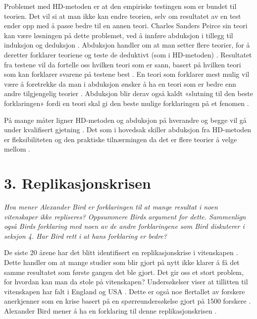 \documentclass[
]{book}
\begin{document}
Problemet med HD-metoden er at den empiriske testingen som er bundet til
teorien. Det vil si at man ikke kan endre teorien, selv om resultatet av
en test ender opp med å passe bedre til en annen teori. Charles Sanders
Peirce sin teori kan være løsningen på dette problemet, ved å innføre
abduksjon i tillegg til induksjon og deduksjon \citep{peirce1992}. Abduksjon
handler om at man setter flere teorier, for å deretter forklarer
teoriene og teste de deduktivt (som i HD-metoden) \citep{peirce1992}.
Resultatet fra testene vil da fortelle oss hvilken teori som er sann,
basert på hvilken teori som kan forklarer svarene på testene best
\citep{peirce1992}. En teori som forklarer mest mulig vil være å foretrekke
da man i abduksjon ønsker å ha en teori som er bedre enn andre
tilgjengelig teorier \citep{peirce1992}. Abduksjon blir derav også kaldt
«slutning til den beste forklaringen» fordi en teori skal gi den beste
mulige forklaringen på et fenomen \citep{peirce1992}.

På mange måter ligner HD-metoden og abduksjon på hverandre og begge vil
gå under kvalifisert gjetning \citep{persson2019} . Det som i hovedsak
skiller abduksjon fra HD-metoden er fleksibiliteten og den praktiske
tilnærmingen da det er flere teorier å velge mellom \citep{peirce1992}.

\hypertarget{replikasjonskrisen}{%
\section{3. Replikasjonskrisen}\label{replikasjonskrisen}}

\emph{Hva mener Alexander Bird er forklaringen til at mange resultat i noen
vitenskaper ikke repliseres? Oppsummere Birds argument for dette.
Sammenlign også Birds forklaring med noen av de andre forklaringene som
Bird diskuterer i seksjon 4. Har Bird rett i at hans forklaring er
bedre?}

De siste 20 årene har det blitt identifisert en replikasjonskrise i
vitenskapen \citep{begley2012, ioannidis2005, opensciencecollaboration2015}. Dette handler om at mange studier som
blir gjort på nytt ikke klarer å få det samme resultatet som første
gangen det ble gjort. Det gir oss et stort problem, for hvordan kan man
da stole på vitenskapen? Undersøkelser viser at tillitten til
vitenskapen har falt i England og USA \citep{funk2016}. Dette er også noe
flertallet av forskere anerkjenner som en krise basert på en
spørreundersøkelse gjort på 1500 forskere \citep{baker2016}. Alexander Bird
mener å ha en forklaring til denne replikasjonskrisen \citep{bird2020}.
\end{document}
